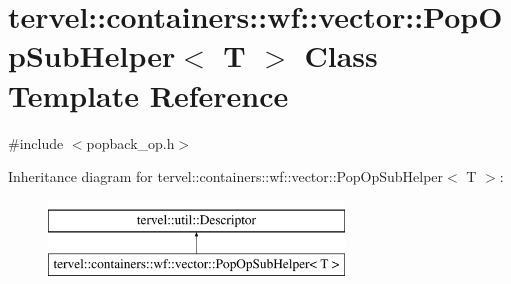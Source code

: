 \hypertarget{classtervel_1_1containers_1_1wf_1_1vector_1_1_pop_op_sub_helper}{}\section{tervel\+:\+:containers\+:\+:wf\+:\+:vector\+:\+:Pop\+Op\+Sub\+Helper$<$ T $>$ Class Template Reference}
\label{classtervel_1_1containers_1_1wf_1_1vector_1_1_pop_op_sub_helper}


{\ttfamily \#include $<$popback\+\_\+op.\+h$>$}

Inheritance diagram for tervel\+:\+:containers\+:\+:wf\+:\+:vector\+:\+:Pop\+Op\+Sub\+Helper$<$ T $>$\+:\begin{figure}[H]
\begin{center}
\leavevmode
\includegraphics[height=2.000000cm]{classtervel_1_1containers_1_1wf_1_1vector_1_1_pop_op_sub_helper}
\end{center}
\end{figure}
